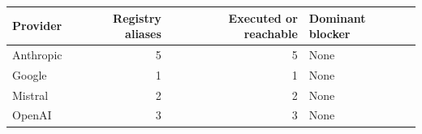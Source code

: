 \begin{tabular}{lrrl}
\toprule
Provider & Registry aliases & Executed or reachable & Dominant blocker \\
\midrule
Anthropic & 5 & 5 & None \\
Google & 1 & 1 & None \\
Mistral & 2 & 2 & None \\
OpenAI & 3 & 3 & None \\
\bottomrule
\end{tabular}

